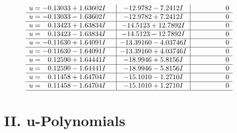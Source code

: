 \documentclass[1p]{elsarticle_modified}
\theoremstyle{definition}
\begin{document}
$$\begin{array}{c|c|c}
\begin{aligned}
u &= -0.13033 + 1.63602 I\end{aligned}
 & -12.9782 - 7.2412 I & \phantom{-0.000000 } 0 \\ \hline\begin{aligned}
u &= -0.13033 - 1.63602 I\end{aligned}
 & -12.9782 + 7.2412 I & \phantom{-0.000000 } 0 \\ \hline\begin{aligned}
u &= \phantom{-}0.13423 + 1.63834 I\end{aligned}
 & -14.5123 + 12.7892 I & \phantom{-0.000000 } 0 \\ \hline\begin{aligned}
u &= \phantom{-}0.13423 - 1.63834 I\end{aligned}
 & -14.5123 - 12.7892 I & \phantom{-0.000000 } 0 \\ \hline\begin{aligned}
u &= -0.11630 + 1.64091 I\end{aligned}
 & -13.39160 - 4.03746 I & \phantom{-0.000000 } 0 \\ \hline\begin{aligned}
u &= -0.11630 - 1.64091 I\end{aligned}
 & -13.39160 + 4.03746 I & \phantom{-0.000000 } 0 \\ \hline\begin{aligned}
u &= \phantom{-}0.12590 + 1.64441 I\end{aligned}
 & -18.9946 + 5.8156 I & \phantom{-0.000000 } 0 \\ \hline\begin{aligned}
u &= \phantom{-}0.12590 - 1.64441 I\end{aligned}
 & -18.9946 - 5.8156 I & \phantom{-0.000000 } 0 \\ \hline\begin{aligned}
u &= \phantom{-}0.11458 + 1.64704 I\end{aligned}
 & -15.1010 - 1.2710 I & \phantom{-0.000000 } 0 \\ \hline\begin{aligned}
u &= \phantom{-}0.11458 - 1.64704 I\end{aligned}
 & -15.1010 + 1.2710 I & \phantom{-0.000000 } 0\\
 \hline 
 \end{array}$$\newpage
\newpage\renewcommand{\arraystretch}{1}
\centering \section*{ II. u-Polynomials}
\end{document}

